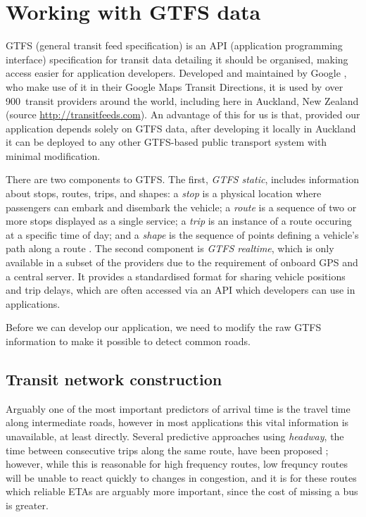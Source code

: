 \section{Working with GTFS data}
\label{sec:gtfs}

GTFS (general transit feed specification)
is an API (application programming interface) specification for transit data
detailing it should be organised,
making access easier for application developers.
Developed and maintained by Google \citep{GoogleDevelopers_2006},
who make use of it in their Google Maps Transit Directions,
it is used by over 900~transit providers around the world,
including here in Auckland, New Zealand
(source \url{http://transitfeeds.com}).
An advantage of this for us is that,
provided our application depends solely on GTFS data,
after developing it locally in Auckland it can be deployed to any other GTFS-based
public transport system with minimal modification.


There are two components to GTFS.
The first, \emph{GTFS static}, includes information about stops, routes, trips, and shapes:
a \emph{stop} is a physical location where passengers can embark and disembark the vehicle;
a \emph{route} is a sequence of two or more stops displayed as a single service;
a \emph{trip} is an instance of a route occuring at a specific time of day; and
a \emph{shape} is the sequence of points defining a vehicle's path along a route
\citep{GoogleDevelopers_2006}.
The second component is \emph{GTFS realtime},
which is only available in a subset of the providers due to the requirement of 
onboard GPS and a central server.
It provides a standardised format for sharing vehicle positions and trip delays,
which are often accessed via an API which developers can use in \rt applications.


Before we can develop our application,
we need to modify the raw GTFS information to make it possible to detect common roads.


\subsection{Transit network construction}
\label{sec:network_build}

Arguably one of the most important predictors of arrival time is
the travel time along intermediate roads,
however in most applications this vital information is unavailable,
at least directly. 
Several predictive approaches using \emph{headway},
the time between consecutive trips along the same route,
have been proposed \citep{Hans_2015};
however, while this is reasonable for high frequency routes,
low frequncy routes will be unable to react quickly to changes in congestion,
and it is for these routes which reliable ETAs are arguably more important,
since the cost of missing a bus is greater.


